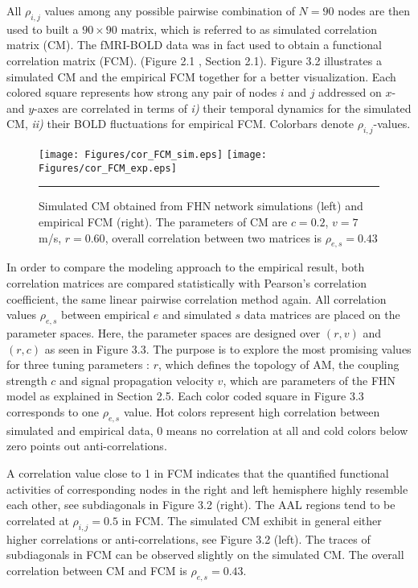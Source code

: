All $\rho_{i,j}$ values among any possible pairwise combination of $N=90$ nodes are then used to built a $90\times 90$  matrix, which is referred to as simulated correlation matrix (CM). The fMRI-BOLD data was in fact used to obtain a functional correlation matrix (FCM). (Figure 2.1 , Section 2.1). Figure 3.2 illustrates a simulated CM and the empirical FCM together for a better visualization. Each colored square represents how strong any pair of nodes $i$ and $j$ addressed on $x$- and $y$-axes are correlated in terms of \textit{i)} their temporal dynamics for the simulated CM, \textit{ii)} their BOLD fluctuations for empirical FCM. Colorbars denote $\rho_{i,j}$-values.


\begin{figure}[htbp]
 
  \centering
	 \texttt{[image: Figures/cor\_FCM\_sim.eps]} 
   	 \texttt{[image: Figures/cor\_FCM\_exp.eps]} 

    \rule{35em}{0.5pt}
  \caption[High correlated FHN simulation, FCM]{ Simulated CM obtained from FHN network simulations (left) and empirical FCM (right). The parameters of CM are $c=0.2$, $v=7$ m/s, $r=0.60$, overall correlation between two matrices is $\rho_{e,s} = 0.43$}
      \label{fig:High correlated FHN simulation, FCM}
 	
\end{figure}  



In order to compare the modeling approach to the empirical result, both correlation matrices are compared statistically with Pearson's correlation coefficient, the same linear pairwise correlation method again. All correlation values $\rho_{e,s}$ between empirical $e$ and simulated $s$ data matrices are placed on the parameter spaces. Here, the parameter spaces are designed over $(r,v)$ and $(r,c)$ as seen in Figure 3.3. The purpose is to explore the most promising values for three tuning parameters : $r$, which defines the topology of AM, the coupling strength $c$ and signal propagation velocity $v$, which are parameters of the FHN model as explained in Section 2.5.  Each color coded square in Figure 3.3 corresponds to one $\rho_{e,s}$ value. Hot colors represent high correlation between simulated and empirical data, 0 means no correlation at all and cold colors below zero points out anti-correlations.


A correlation value close to 1 in FCM indicates that the quantified functional activities of corresponding nodes in the right and left hemisphere highly resemble each other, see subdiagonals in Figure 3.2 (right). The AAL regions tend to be correlated at $\rho_{i,j}=0.5$ in FCM. The simulated CM exhibit in general either higher correlations or anti-correlations, see Figure 3.2 (left). The traces of subdiagonals in FCM can be observed slightly on the simulated CM. The overall correlation between CM and FCM is $\rho_{e,s}=0.43$. 


